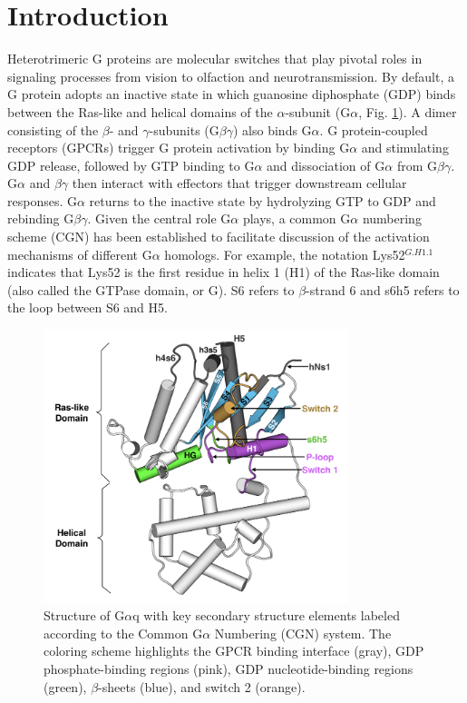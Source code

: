 \documentclass[../main.tex]{subfiles}
\begin{document}
	\section{Introduction}
        Heterotrimeric G proteins are molecular switches that play pivotal roles in signaling processes from vision to olfaction and neurotransmission\cite{Oldham:2006ui,Oldham:2008cr,Johnston:2007ir}. By default, a G protein adopts an inactive state in which guanosine diphosphate (GDP) binds between the Ras-like and helical domains of the $\alpha$-subunit (G$\alpha$, Fig. \ref{fig:ch4-fig1}). A dimer consisting of the $\beta$- and $\gamma$-subunits (G$\beta\gamma$) also binds G$\alpha$. G protein-coupled receptors (GPCRs) trigger G protein activation by binding G$\alpha$ and stimulating GDP release, followed by GTP binding to G$\alpha$ and dissociation of G$\alpha$ from G$\beta\gamma$. G$\alpha$ and $\beta\gamma$ then interact with effectors that trigger downstream cellular responses. G$\alpha$ returns to the inactive state by hydrolyzing GTP to GDP and rebinding G$\beta\gamma$. Given the central role G$\alpha$ plays, a common G$\alpha$ numbering scheme (CGN) has been established to facilitate discussion of the activation mechanisms of different G$\alpha$ homologs\cite{Flock:2015dj}. For example, the notation Lys52$^{G.H1.1}$ indicates that Lys52 is the first residue in helix 1 (H1) of the Ras-like domain (also called the GTPase domain, or G). S6 refers to $\beta$-strand 6 and s6h5 refers to the loop between S6 and H5.

    \begin{figure}[!htb] %
        \centering
        \includegraphics[width=3.5in]{ch4-fig1.png}
        \caption[Structure of G$\alpha$q with key secondary structure elements labeled according to the Common G$\alpha$ Numbering (CGN) system.]
            {Structure of G$\alpha$q with key secondary structure elements labeled according to the Common G$\alpha$ Numbering (CGN) system. The coloring scheme highlights the GPCR binding interface (gray), GDP phosphate-binding regions (pink), GDP nucleotide-binding regions (green), $\beta$-sheets (blue), and switch 2 (orange).}
        \label{fig:ch4-fig1}
    \end{figure}
\end{document}
